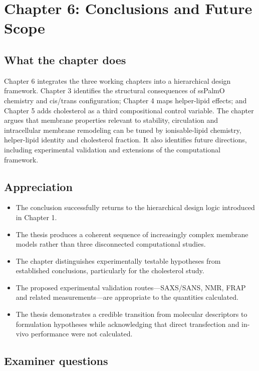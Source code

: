 \documentclass[11pt,a4paper]{article}
\begin{document}
\section{Chapter 6: Conclusions and Future Scope}

\subsection*{What the chapter does}

Chapter 6 integrates the three working chapters into a hierarchical design framework. Chapter 3 identifies the structural consequences of ssPalmO chemistry and cis/trans configuration; Chapter 4 maps helper-lipid effects; and Chapter 5 adds cholesterol as a third compositional control variable. The chapter argues that membrane properties relevant to stability, circulation and intracellular membrane remodeling can be tuned by ionisable-lipid chemistry, helper-lipid identity and cholesterol fraction. It also identifies future directions, including experimental validation and extensions of the computational framework.

\subsection*{Appreciation}

\begin{itemize}[leftmargin=*]
\item The conclusion successfully returns to the hierarchical design logic introduced in Chapter 1.
\item The thesis produces a coherent sequence of increasingly complex membrane models rather than three disconnected computational studies.
\item The chapter distinguishes experimentally testable hypotheses from established conclusions, particularly for the cholesterol study.
\item The proposed experimental validation routes---SAXS/SANS, NMR, FRAP and related measurements---are appropriate to the quantities calculated.
\item The thesis demonstrates a credible transition from molecular descriptors to formulation hypotheses while acknowledging that direct transfection and in-vivo performance were not calculated.
\end{itemize}

\subsection*{Examiner questions}
\end{document}
